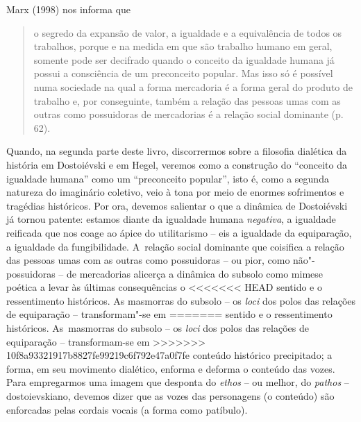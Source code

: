 {Marx (1998) nos informa que

\begin{quote}
o segredo da expansão de valor, a igualdade e a equivalência de todos os
trabalhos, porque e na medida em que são trabalho humano em geral,
somente pode ser decifrado quando o conceito da igualdade humana já
possui a consciência de um preconceito popular. Mas isso só é possível
numa sociedade na qual a forma mercadoria é a forma geral do produto de
trabalho e, por conseguinte, também a relação das pessoas umas com as
outras como possuidoras de mercadorias é a relação social dominante (p.
62).
\end{quote}

Quando, na segunda parte deste livro, discorrermos sobre a filosofia
dialética da história em Dostoiévski e em Hegel, veremos como a
construção do ``conceito da igualdade humana'' como um ``preconceito
popular'', isto é, como a segunda natureza do imaginário coletivo, veio
à tona por meio de enormes sofrimentos e tragédias históricos. Por ora,
devemos salientar o que a dinâmica de Dostoiévski já tornou patente:
estamos diante da igualdade humana \emph{negativa}, a igualdade
reificada que nos coage ao ápice do utilitarismo -- eis a igualdade da
equiparação, a igualdade da fungibilidade. A~relação social dominante
que coisifica a relação das pessoas umas com as outras como possuidoras
-- ou pior, como não"-possuidoras -- de mercadorias alicerça a dinâmica
do subsolo como mimese poética a levar às últimas consequências o
<<<<<<< HEAD
sentido e o ressentimento históricos. As masmorras do subsolo -- os
\emph{loci} dos polos das relações de equiparação -- transformam"-se em
=======
sentido e o ressentimento históricos. As~masmorras do subsolo -- os
\emph{loci} dos polos das relações de equiparação -- transformam-se em
>>>>>>> 10f8a93321917b8827fe99219c6f792e47a0f7fe
conteúdo histórico precipitado; a forma, em seu movimento dialético,
enforma e deforma o conteúdo das vozes. Para empregarmos uma imagem que
desponta do \emph{ethos} -- ou melhor, do \emph{pathos} --
dostoievskiano, devemos dizer que as vozes das personagens (o conteúdo)
são enforcadas pelas cordais vocais (a forma como patíbulo).

}
